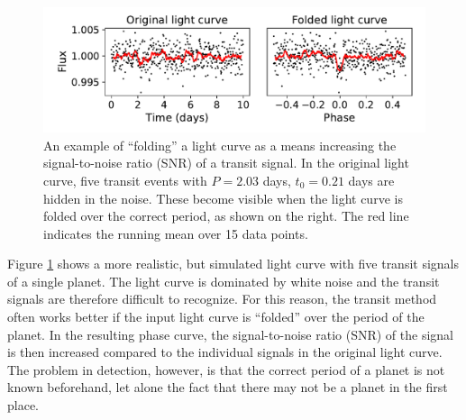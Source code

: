 \begin{figure}
    \centering
    \includegraphics[width=0.6\linewidth]{Background/Figures/folding.pdf}
    \caption{An example of ``folding'' a light curve as a means increasing the signal-to-noise ratio (SNR) of a transit signal. In the original light curve, five transit events with $P= 2.03$ days, $t_0= 0.21$ days are hidden in the noise. These become visible when the light curve is folded over the correct period, as shown on the right. The red line indicates the running mean over 15 data points.}
    \label{fig:folding}
\end{figure}

Figure \ref{fig:folding} shows a more realistic, but simulated light curve with five transit signals of a single planet. The light curve is dominated by white noise and the transit signals are therefore difficult to recognize. For this reason, the transit method often works better if the input light curve is ``folded'' over the period of the planet. In the resulting phase curve, the signal-to-noise ratio (SNR) of the signal is then increased compared to the individual signals in the original light curve. The problem in detection, however, is that the correct period of a planet is not known beforehand, let alone the fact that there may not be a planet in the first place.
